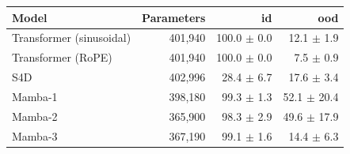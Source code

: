 \begin{tabular}{lrrr}
\toprule
Model & Parameters & id & ood \\
\midrule
Transformer (sinusoidal) & 401,940 & 100.0 $\pm$ 0.0 & 12.1 $\pm$ 1.9 \\
Transformer (RoPE) & 401,940 & 100.0 $\pm$ 0.0 & 7.5 $\pm$ 0.9 \\
S4D & 402,996 & 28.4 $\pm$ 6.7 & 17.6 $\pm$ 3.4 \\
Mamba-1 & 398,180 & 99.3 $\pm$ 1.3 & 52.1 $\pm$ 20.4 \\
Mamba-2 & 365,900 & 98.3 $\pm$ 2.9 & 49.6 $\pm$ 17.9 \\
Mamba-3 & 367,190 & 99.1 $\pm$ 1.6 & 14.4 $\pm$ 6.3 \\
\bottomrule
\end{tabular}
\par{}
